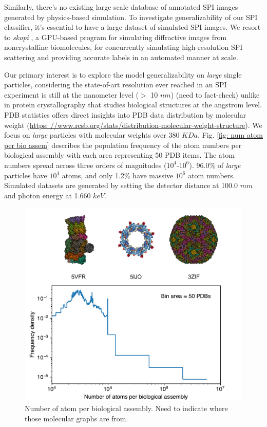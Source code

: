 Similarly, there's no existing large scale database of annotated SPI images
generated by physics-based simulation.  To investigate generalizability of our
SPI classifier, it's essential to have a large dataset of simulated SPI images.
We resort to \textit{skopi} \cite{peckSkopiSimulationPackage2021}, a GPU-based
program for simulating diffractive images from noncrystalline biomolecules, for
concurrently simulating high-resolution SPI scattering and providing accurate
labels in an automated manner at scale.  

Our primary interest is to explore the model generalizability on \textit{large}
single particles, considering the state-of-art resolution ever reached in an SPI
experiment is still at the nanometer level ($>$ 10 $nm$) {\color{red} (need to
fact-check)} unlike in protein crystallography that studies biological
structures at the angstrom level.  PDB statistics offers direct insights into
PDB data distribution by molecular weight (\url{https:
//www.rcsb.org/stats/distribution-molecular-weight-structure}).  We focus on
\textit{large} particles with molecular weights over 380 $KDa$.  Fig. \ref{fig:
num atom per bio assem} describes the population frequency of the atom numbers
per biological assembly with each area representing 50 PDB items.  The atom
numbers spread across three orders of magnitudes ($10^4\text{-}10^6$).  96.0\%
of \textit{large} particles have $10^4$ atoms, and only 1.2\% have massive
$10^6$ atom numbers. Simulated datasets are generated by setting the detector
distance at 100.0 $mm$ and photon energy at 1.660 $keV$.  

\begin{figure}
\includegraphics[width=1.0\textwidth,keepaspectratio]
{./figures/num_atom_per_bio_assem.pdf}
\caption{Number of atom per biological assembly. {\color{red} Need to indicate where
those molecular graphs are from.}}
\label{fig: num atom per bio assem}
\end{figure}


